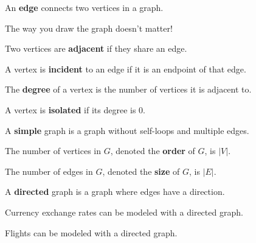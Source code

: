 \documentclass[a4paper]{article}
\begin{document}
\begin{definition}
	An \textbf{edge} connects two vertices in a graph.
\end{definition}

\begin{note}
	The way you draw the graph doesn't matter!
\end{note}

\begin{definition}
	Two vertices are \textbf{adjacent} if they share an edge.
\end{definition}

\begin{definition}
	A vertex is \textbf{incident} to an edge if it is an endpoint of that edge.
\end{definition}

\begin{definition}
	The \textbf{degree} of a vertex is the number of vertices it is adjacent to.
\end{definition}

\begin{definition}
	A vertex is \textbf{isolated} if its degree is 0.
\end{definition}

\begin{definition}
	A \textbf{simple} graph is a graph without self-loops and multiple edges.
\end{definition}

\begin{definition}
	The number of vertices in \( G \), denoted the \textbf{order} of \( G \), is \( |V| \).
\end{definition}

\begin{definition}
	The number of edges in \( G \), denoted the \textbf{size} of \( G \), is \( |E| \).
\end{definition}

\begin{definition}
	A \textbf{directed} graph is a graph where edges have a direction.
\end{definition}

\begin{eg}
	Currency exchange rates can be modeled with a directed graph.
\end{eg}

\begin{eg}
	Flights can be modeled with a directed graph.
\end{eg}
\end{document}
